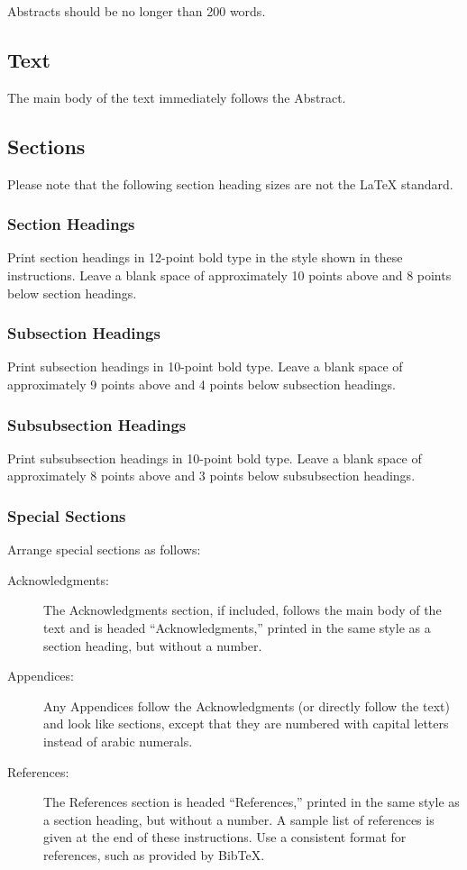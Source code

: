 Abstracts should be no longer than 200 words.

\subsection{Text}
The main body of the text immediately follows the Abstract. 

\subsection{Sections}

Please note that the following section heading sizes are not the \LaTeX{}
standard.

\subsubsection{Section Headings}

Print section headings in 12-point bold type in the style shown in these
instructions.  Leave a blank space of approximately 10 points above and 8
points below section headings.

\subsubsection{Subsection Headings}

Print subsection headings in 10-point bold type.  Leave a blank space of
approximately 9 points above and 4 points below subsection headings.

\subsubsection{Subsubsection Headings}

Print subsubsection headings in 10-point bold type.  Leave a blank space of
approximately 8 points above and 3 points below subsubsection headings.

\subsubsection{Special Sections}

Arrange special sections as follows:
\begin{description}
\item[Acknowledgments:] 
The Acknowledgments section, if included, follows the main body of the text
and is headed ``Acknowledgments,'' printed in the same style as a section
heading, but without a number. 
\item[Appendices:] 
Any Appendices follow the Acknowledgments (or directly follow the text) and
look like sections, except that they are numbered with capital letters
instead of arabic numerals. 
\item[References:]
The References section is headed ``References,'' printed in the same
style as a section heading, but without a number.
A sample list of references is given at the end of these
instructions.
Use a consistent format for references, such as provided by
Bib\TeX{}.
\end{description}


